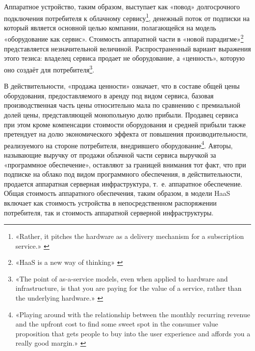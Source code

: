 \documentclass{article}
\begin{document}
Аппаратное устройство, таким образом, выступает как «повод» долгосрочного подключения потребителя к облачному сервису\footnote{«Rather, it pitches the hardware as a delivery mechanism for a subscription service.» \cite{staceyoniotFeatureOfHardwareSubscription2022}}, денежный поток от подписки на который является основной целью компании, полагающейся на модель «оборудование как сервис». Стоимость аппаратной части в «новой парадигме»\footnote{«HaaS is a new way of thinking» \cite{howHaasWillSaveIot2016}} представляется незначительной величиной. Распространенный вариант выражения этого тезиса: владелец сервиса продает не оборудование, а «ценность», которую оно создаёт для потребителя\footnote{«The point of as-a-service models, even when applied to hardware and infrastructure, is that you are paying for the value of a service, rather than the underlying hardware.» \cite{oxenHaasVsLeasing2020}}.

В действительности, «продажа ценности» означает, что в составе общей цены оборудования, предоставляемого в аренду под видом сервиса, базовая производственная часть цены относительно мала по сравнению с премиальной долей цены, представляющей монопольную долю прибыли. Продавец сервиса при этом кроме компенсации стоимости оборудования и средней прибыли также претендует на долю экономического эффекта от повышения производительности, реализуемого на стороне потребителя, внедрившего оборудование\footnote{«Playing around with the relationship between the monthly recurring revenue and the upfront cost to find some sweet spot in the consumer value proposition that gets people to buy into the user experience and affords you a really good margin.» \cite{nyTimesPeloton2022}}. Авторы, называющие выручку от продажи облачной части сервиса выручкой за «программное обеспечение», оставляют за границей внимания тот факт, что при подписке на облако под видом программного обеспечения, в действительности, продается аппаратная серверная инфраструктура, т.~е. аппаратное обеспечение. Общая стоимость аппаратного обеспечения, таким образом, в модели HaaS включает как стоимость устройства в непосредственном распоряжении потребителя, так и стоимость аппаратной серверной инфраструктуры.
\end{document}
